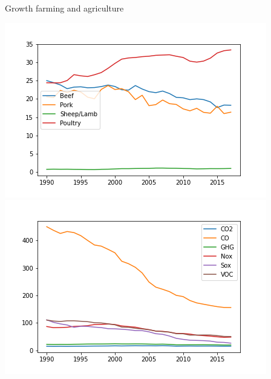 \documentclass[t,9pt,aspectratio=169]{beamer}
\begin{document}
\begin{frame}{Growth farming and agriculture }
\begin{center}
\includegraphics[scale=0.4 ]{./figures/graph_meat} \includegraphics[scale=0.4]{./figures/index_2_time} 
\end{center}
\end{frame} 
\end{document}
